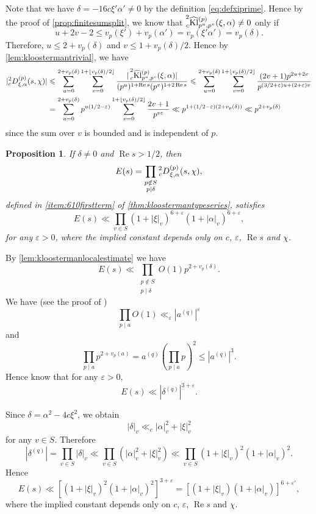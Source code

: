 \documentclass[10pt,oneside,reqno]{amsart}
\makeatletter
\renewcommand\Re{\mathop{\mathrm{Re}}}
\newcommand\Kl{\mathrm{Kl}}
\renewcommand\leq{\leqslant}
\theoremstyle{THEOREM}
\newtheorem{proposition}[theorem]{Proposition}
\theoremstyle{DEFINITION}
\theoremstyle{EXERCISE}
\numberwithin{equation}{section}
\renewenvironment{proof}[1][\proofname]{\par
  \vspace{-6pt}
  \pushQED{\qed}
  \normalfont \topsep6\p@\@plus6\p@\relax
  \trivlist
  \item[\hskip\labelsep\rmfamily\bfseries
    #1\@addpunct{:}]\ignorespaces
}{
  \popQED\endtrivlist\@endpefalse
  \vspace{-6pt}
}
\makeatother
\begin{document}
\begin{proof}
Note that we have $\delta=-16c\xi'\alpha'\neq 0$ by the definition \eqref{eq:defxiprime}. Hence by the proof of \autoref{prop:finitesumsplit}, we know that $\prescript{2}{c}{\widehat{\Kl}}_{p^u,p^v}^{(p)}(\xi,\alpha)\neq 0$ only if 
\[
u+2v-2\leq v_p(\xi')+v_p(\alpha')=v_p(\xi'\alpha')=v_p(\delta).
\]
Therefore, $u\leq 2+v_p(\delta)$ and $v\leq 1+v_p(\delta)/2$. Hence by \autoref{lem:kloostermantrivial}, we have
\begin{align*}
|{}_c^2D_{\xi,\alpha}^{(p)}(s,\chi)|&\leq \sum_{u=0}^{2+v_p(\delta)} \sum_{v=0}^{1+\lfloor v_p(\delta)/2\rfloor}\frac{|\prescript{2}{c}{\widehat{\Kl}}_{p^u,p^v}^{(p)} (\xi,\alpha)|}{(p^u)^{1+\Re s}(p^v)^{1+2\Re s}}\leq \sum_{u=0}^{2+v_p(\delta)} \sum_{v=0}^{1+\lfloor v_p(\delta)/2\rfloor}\frac{(2v+1)p^{2u+2v}}{p^{(3/2+\varepsilon) u+(2+\varepsilon)v}}\\
&=\sum_{u=0}^{2+v_p(\delta)}p^{u(1/2-\varepsilon)} \sum_{v=0}^{1+\lfloor v_p(\delta)/2\rfloor}\frac{2v+1}{p^{v\varepsilon}}\ll p^{1+(1/2-\varepsilon)(2+v_p(\delta))}\ll p^{2+v_p(\delta)}
\end{align*}
since the sum over $v$ is bounded and is independent of $p$.
\end{proof} 

\begin{proposition}\label{prop:kloostermansumbound}
If $\delta\neq 0$ and $\Re s>1/2$, then
\[
E(s)=\prod_{\substack{p\notin S\\p\mid\delta}}\prescript{2}{c}D_{\xi,\alpha}^{(p)}(s,\chi),
\]
defined in \autoref{item:610firstterm} of \autoref{thm:kloostermantypeseries}, satisfies
\[
E(s)\ll \prod_{v\in S}(1+|\xi|_v)^{6+\varepsilon}(1+|\alpha|_v)^{6+\varepsilon},
\]
for any $\varepsilon>0$,
where the implied constant depends only on $c$, $\varepsilon$, $\Re s$ and $\chi$.
\end{proposition}
\begin{proof}
By \autoref{lem:kloostermanlocalestimate} we have
\[
  E(s)\ll\prod_{\substack{p\notin S\\p\mid\delta}}O(1)p^{2+v_p(\delta)}.
\]
We have (see the proof of \cite[Corollary B.3]{cheng2025b})
\[
\prod_{p\mid a}O(1)\ll_\varepsilon |a^{(q)}|^\varepsilon
\]
and
\[
\prod_{p\mid a}p^{2+v_p(a)}=a^{(q)}\left(\prod_{p\mid a}p\right)^2\leq |a^{(q)}|^3.
\]
Hence know that for any $\varepsilon>0$,
\[
E(s)\ll|\delta^{(q)}|^{3+\varepsilon}.
\]

Since $\delta=\alpha^2-4c\xi^2$, we obtain
\[
|\delta|_v\ll_c |\alpha|_v^2+|\xi|_v^2
\]
for any $v\in S$. Therefore
\begin{equation}\label{eq:estimatedeltaq}
|\delta^{(q)}|=\prod_{v\in S}|\delta|_v\ll \prod_{v\in S}(|\alpha|_v^2+|\xi|_v^2)\ll \prod_{v\in S}(1+|\xi|_v)^2(1+|\alpha|_v)^2.
\end{equation}
Hence
\[
E(s)\ll\left[(1+|\xi|_v)^2(1+|\alpha|_v)^2\right]^{3+\varepsilon}=\left[(1+|\xi|_v) (1+|\alpha|_v)\right]^{6+\varepsilon'},
\]
where the implied constant depends only on $c$, $\varepsilon$, $\Re s$ and $\chi$.
\end{proof}
\end{document}
